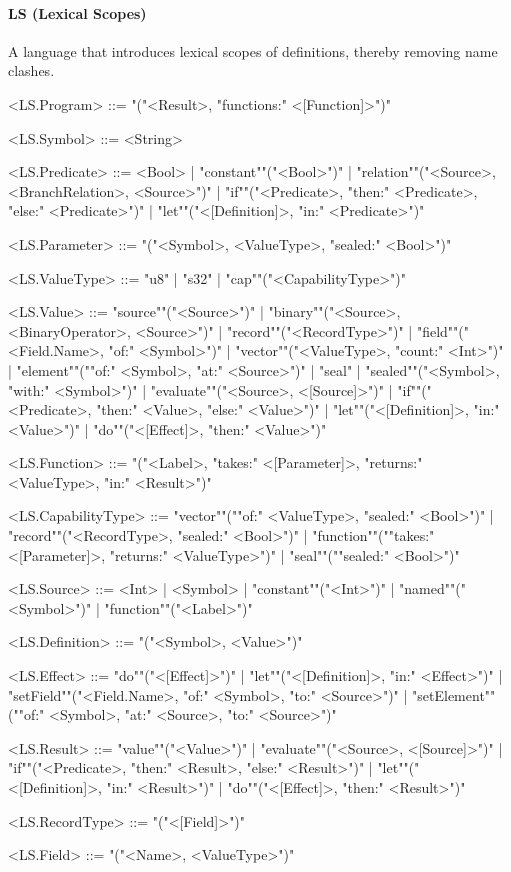 \documentclass[main.tex]{subfiles}
\begin{document}
\paragraph{ LS (Lexical Scopes) } A language that introduces lexical scopes of definitions, thereby removing name clashes.
\begin{grammar}
	\footnotesize
				<LS.Program> ::=
							"("<Result>, "functions:" <[Function]>")"
				\par
				<LS.Symbol> ::=
						<String>
				\par
				<LS.Predicate> ::=
						<Bool> |
						"constant""("<Bool>")"
						| "relation""("<Source>, <BranchRelation>, <Source>")"
						| "if""("<Predicate>, "then:" <Predicate>, "else:" <Predicate>")"
						| "let""("<[Definition]>, "in:" <Predicate>")"
				\par
				<LS.Parameter> ::=
							"("<Symbol>, <ValueType>, "sealed:" <Bool>")"
				\par
				<LS.ValueType> ::=
						"u8"
						| "s32"
						| "cap""("<CapabilityType>")"
				\par
				<LS.Value> ::=
						"source""("<Source>")"
						| "binary""("<Source>, <BinaryOperator>, <Source>")"
						| "record""("<RecordType>")"
						| "field""("<Field.Name>, "of:" <Symbol>")"
						| "vector""("<ValueType>, "count:" <Int>")"
						| "element""(""of:" <Symbol>, "at:" <Source>")"
						| "seal"
						| "sealed""("<Symbol>, "with:" <Symbol>")"
						| "evaluate""("<Source>, <[Source]>")"
						| "if""("<Predicate>, "then:" <Value>, "else:" <Value>")"
						| "let""("<[Definition]>, "in:" <Value>")"
						| "do""("<[Effect]>, "then:" <Value>")"
				\par
				<LS.Function> ::=
							"("<Label>, "takes:" <[Parameter]>, "returns:" <ValueType>, "in:" <Result>")"
				\par
				<LS.CapabilityType> ::=
						"vector""(""of:" <ValueType>, "sealed:" <Bool>")"
						| "record""("<RecordType>, "sealed:" <Bool>")"
						| "function""(""takes:" <[Parameter]>, "returns:" <ValueType>")"
						| "seal""(""sealed:" <Bool>")"
				\par
				<LS.Source> ::=
						<Int> |
								<Symbol> |
						"constant""("<Int>")"
						| "named""("<Symbol>")"
						| "function""("<Label>")"
				\par
				<LS.Definition> ::=
							"("<Symbol>, <Value>")"
				\par
				<LS.Effect> ::=
						"do""("<[Effect]>")"
						| "let""("<[Definition]>, "in:" <Effect>")"
						| "setField""("<Field.Name>, "of:" <Symbol>, "to:" <Source>")"
						| "setElement""(""of:" <Symbol>, "at:" <Source>, "to:" <Source>")"
				\par
				<LS.Result> ::=
						"value""("<Value>")"
						| "evaluate""("<Source>, <[Source]>")"
						| "if""("<Predicate>, "then:" <Result>, "else:" <Result>")"
						| "let""("<[Definition]>, "in:" <Result>")"
						| "do""("<[Effect]>, "then:" <Result>")"
				\par
				<LS.RecordType> ::=
							"("<[Field]>")"
				\par
				<LS.Field> ::=
							"("<Name>, <ValueType>")"
				\par
\end{grammar}
\par
\end{document}
